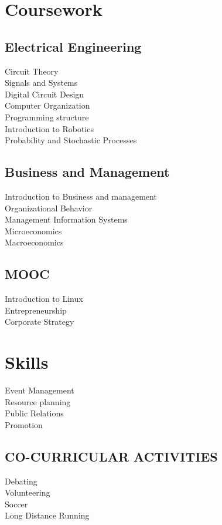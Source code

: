 \documentclass[]{deedy-resume-openfont}
\begin{document}
\begin{minipage}[t]{0.33\textwidth}
\section{Coursework}
\subsection{Electrical Engineering}
Circuit Theory \\
Signals and Systems \\
Digital Circuit Design  \\
Computer Organization \\
Programming structure \\
Introduction to Robotics\\
Probability and Stochastic Processes\\
\sectionsep

\subsection{Business and Management}
Introduction to Business and management \\
Organizational Behavior \\
Management Information Systems\\
Microeconomics\\
Macroeconomics\\
\sectionsep


\subsection{MOOC}
Introduction to Linux\\
Entrepreneurship\\
Corporate Strategy\\


\section{Skills}
Event Management\\
Resource planning\\
Public Relations\\
Promotion\\
\sectionsep


\subsection{CO-CURRICULAR ACTIVITIES}
Debating\\
Volunteering\\
Soccer\\
Long Distance Running\\
\sectionsep

%
%

\end{minipage} 
\end{document}
